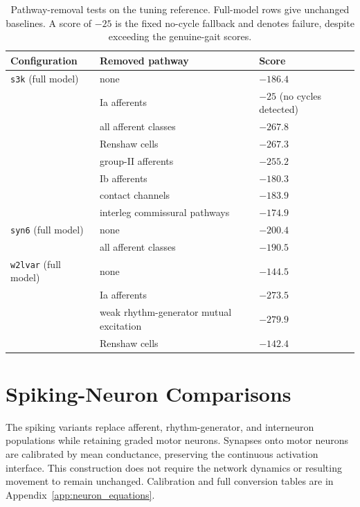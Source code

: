\begin{table}[htbp]
\caption{Pathway-removal tests on the tuning reference. Full-model rows give unchanged baselines. A score of $-25$ is the fixed no-cycle fallback and denotes failure, despite exceeding the genuine-gait scores.}
\label{tab:walker_ablations}
\small\begin{tabularx}{\textwidth}{@{}>{\raggedright\arraybackslash}p{}>{\raggedright\arraybackslash}X>{\raggedright\arraybackslash}p{}@{}}
\toprule
\textbf{Configuration} & \textbf{Removed pathway} & \textbf{Score} \\
\midrule
\texttt{s3k} (full model) & none & $-186.4$ \\
 & Ia afferents & $-25$ (no cycles detected) \\
 & all afferent classes & $-267.8$ \\
 & Renshaw cells & $-267.3$ \\
 & group-II afferents & $-255.2$ \\
 & Ib afferents & $-180.3$ \\
 & contact channels & $-183.9$ \\
 & interleg commissural pathways & $-174.9$ \\
\addlinespace
\texttt{syn6} (full model) & none & $-200.4$ \\
 & all afferent classes & $-190.5$ \\
\addlinespace
\texttt{w2lvar} (full model) & none & $-144.5$ \\
 & Ia afferents & $-273.5$ \\
 & weak rhythm-generator mutual excitation & $-279.9$ \\
 & Renshaw cells & $-142.4$ \\
\bottomrule
\end{tabularx}
\end{table}

\section{Spiking-Neuron Comparisons}\label{sec:spiking_methods}\label{sec:spiking_results}\label{sec:disc_spiking}

The spiking variants replace afferent, rhythm-generator, and interneuron populations while retaining graded motor neurons. Synapses onto motor neurons are calibrated by mean conductance, preserving the continuous activation interface. This construction does not require the network dynamics or resulting movement to remain unchanged. Calibration and full conversion tables are in Appendix~\ref{app:neuron_equations}.

